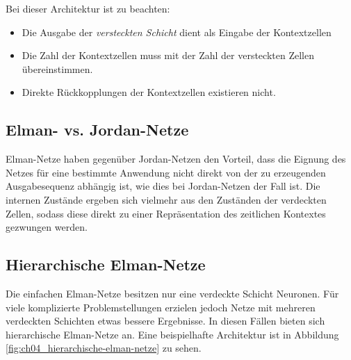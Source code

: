 Bei dieser Architektur ist zu beachten:
\begin{itemize}
	\item Die Ausgabe der \emph{versteckten Schicht} dient als Eingabe der Kontextzellen
	\item Die Zahl der Kontextzellen muss mit der Zahl der versteckten Zellen übereinstimmen.
	\item Direkte Rückkopplungen der Kontextzellen existieren nicht.
\end{itemize}

\subsection*{Elman- vs. Jordan-Netze}
Elman-Netze haben gegenüber Jordan-Netzen den Vorteil, dass die Eignung des Netzes für eine bestimmte Anwendung nicht direkt von der zu erzeugenden Ausgabesequenz abhängig ist, wie dies bei Jordan-Netzen der Fall ist. Die internen Zustände ergeben sich vielmehr aus den Zuständen der verdeckten Zellen, sodass diese direkt zu einer Repräsentation des zeitlichen Kontextes gezwungen werden.

\subsection*{Hierarchische Elman-Netze}
Die einfachen Elman-Netze besitzen nur eine verdeckte Schicht Neuronen. Für viele komplizierte Problemstellungen erzielen jedoch Netze mit mehreren verdeckten Schichten etwas bessere Ergebnisse. In diesen Fällen bieten sich hierarchische Elman-Netze an.
Eine beispielhafte Architektur ist in Abbildung \ref{fig:ch04_hierarchische-elman-netze} zu sehen.

